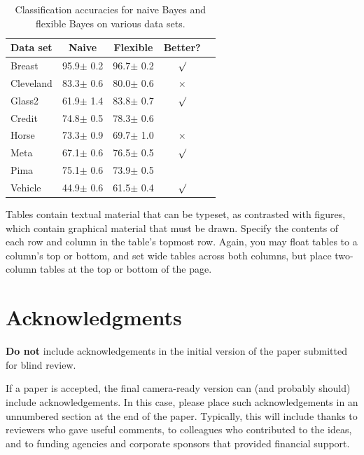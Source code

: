 \documentclass{article}
\begin{document}
\begin{table}[t]
\caption{Classification accuracies for naive Bayes and flexible 
Bayes on various data sets.}
\label{sample-table}
\vskip 0.15in
\begin{center}
\begin{small}
\begin{sc}
\begin{tabular}{lcccr}
\hline
\abovespace\belowspace
Data set & Naive & Flexible & Better? \\
\hline
\abovespace
Breast    & 95.9$\pm$ 0.2& 96.7$\pm$ 0.2& $\surd$ \\
Cleveland & 83.3$\pm$ 0.6& 80.0$\pm$ 0.6& $\times$\\
Glass2    & 61.9$\pm$ 1.4& 83.8$\pm$ 0.7& $\surd$ \\
Credit    & 74.8$\pm$ 0.5& 78.3$\pm$ 0.6&         \\
Horse     & 73.3$\pm$ 0.9& 69.7$\pm$ 1.0& $\times$\\
Meta      & 67.1$\pm$ 0.6& 76.5$\pm$ 0.5& $\surd$ \\
Pima      & 75.1$\pm$ 0.6& 73.9$\pm$ 0.5&         \\
\belowspace
Vehicle   & 44.9$\pm$ 0.6& 61.5$\pm$ 0.4& $\surd$ \\
\hline
\end{tabular}
\end{sc}
\end{small}
\end{center}
\vskip -0.1in
\end{table}

Tables contain textual material that can be typeset, as contrasted 
with figures, which contain graphical material that must be drawn. 
Specify the contents of each row and column in the table's topmost
row. Again, you may float tables to a column's top or bottom, and set
wide tables across both columns, but place two-column tables at the
top or bottom of the page.
 


\section*{Acknowledgments} 
 
\textbf{Do not} include acknowledgements in the initial version of
the paper submitted for blind review.

If a paper is accepted, the final camera-ready version can (and
probably should) include acknowledgements. In this case, please
place such acknowledgements in an unnumbered section at the
end of the paper. Typically, this will include thanks to reviewers
who gave useful comments, to colleagues who contributed to the ideas, 
and to funding agencies and corporate sponsors that provided financial 
support.  





\end{document}
